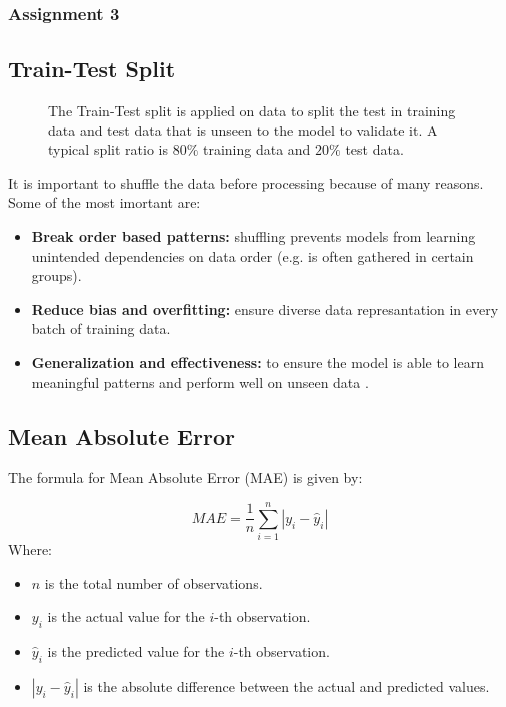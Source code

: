 \documentclass[12pt]{article}
\begin{document}
\newpage

\subsubsection{Assignment 3}
\subsection{Train-Test Split}

\begin{figure}[h]
\centering
{}
    \caption{The Train-Test split is applied on data to split the test in training data and test data that is unseen to the model to validate it. A typical split ratio is $80\%$ training data and $20\%$ test data. }
\end{figure}
It is important to shuffle the data before processing because of many reasons. Some of the most imortant are: 
\begin{itemize}
    \item \textbf{Break order based patterns:} shuffling prevents models from learning unintended dependencies on data order (e.g. is often gathered in certain groups).
    \item \textbf{Reduce bias and overfitting:} ensure diverse data represantation in every batch of training data.
    \item \textbf{Generalization and effectiveness:} to ensure the model is able to learn meaningful patterns and perform well on unseen data .
\end{itemize}
\subsection{Mean Absolute Error}

The formula for Mean Absolute Error (MAE) is given by:

\[MAE = \frac{1}{n} \sum_{i=1}^{n} | y_i - \hat{y}_i |\]
Where:
\begin{itemize}
    \item \(n\) is the total number of observations.
    \item \(y_i\) is the actual value for the \(i\)-th observation.
    \item \(\hat{y}_i\) is the predicted value for the \(i\)-th observation.
    \item \( | y_i - \hat{y}_i | \) is the absolute difference between the actual and predicted values.
\end{itemize}
\end{document}
